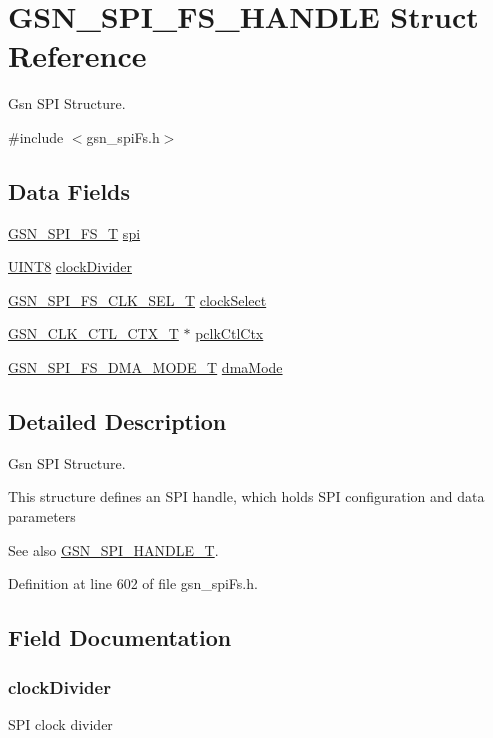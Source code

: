 \hypertarget{a00234}{
\section{GSN\_\-SPI\_\-FS\_\-HANDLE Struct Reference}
\label{a00234}
}


Gsn SPI Structure.  




{\ttfamily \#include $<$gsn\_\-spiFs.h$>$}

\subsection*{Data Fields}
\begin{DoxyCompactItemize}
\item 
\hyperlink{a00232}{GSN\_\-SPI\_\-FS\_\-T} \hyperlink{a00234_a14e4b696104ff7e1399948a31301abc2}{spi}
\item 
\hyperlink{a00660_gab27e9918b538ce9d8ca692479b375b6a}{UINT8} \hyperlink{a00234_ae7807face22c73f3541066336176a60d}{clockDivider}
\item 
\hyperlink{a00655_ga0d31f3f2784c160b1ad748b232f4ae7b}{GSN\_\-SPI\_\-FS\_\-CLK\_\-SEL\_\-T} \hyperlink{a00234_aafc9460aea176e2b77f84f6d8505b5dc}{clockSelect}
\item 
\hyperlink{a00039}{GSN\_\-CLK\_\-CTL\_\-CTX\_\-T} $\ast$ \hyperlink{a00234_a87fd9dda5636bd71a412693b96fed177}{pclkCtlCtx}
\item 
\hyperlink{a00655_ga1348552a2785bfc5647d4b4aa234c64c}{GSN\_\-SPI\_\-FS\_\-DMA\_\-MODE\_\-T} \hyperlink{a00234_ac51b04e9415de12b2e97604acf5c3adc}{dmaMode}
\end{DoxyCompactItemize}


\subsection{Detailed Description}
Gsn SPI Structure. 

This structure defines an SPI handle, which holds SPI configuration and data parameters

\begin{DoxySeeAlso}{See also}
\hyperlink{a00655_ga046c33438e29676344675866f7935308}{GSN\_\-SPI\_\-HANDLE\_\-T}. 
\end{DoxySeeAlso}


Definition at line 602 of file gsn\_\-spiFs.h.



\subsection{Field Documentation}
\hypertarget{a00234_ae7807face22c73f3541066336176a60d}{
\subsubsection[{clockDivider}]{ {\bf clockDivider}}}
\label{a00234_ae7807face22c73f3541066336176a60d}
SPI clock divider 


